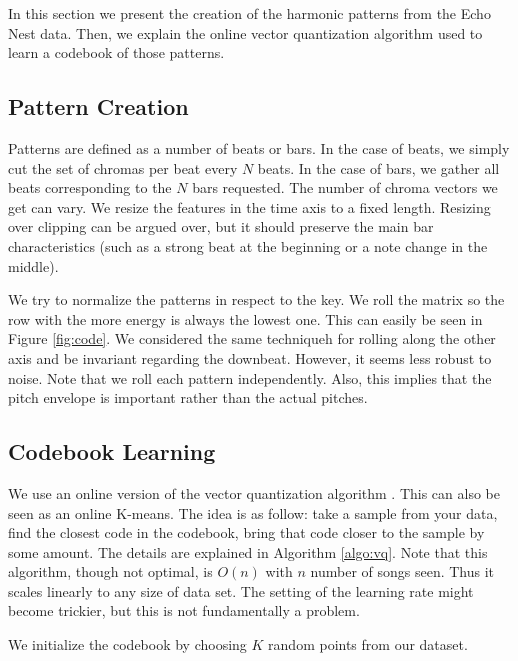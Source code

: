 \documentclass{article}
\begin{document}
In this section we present the creation of the harmonic patterns from
the Echo Nest data. Then, we explain the online vector quantization algorithm
used to learn a codebook of those patterns.

\subsection{Pattern Creation}
Patterns are defined as a number of beats or bars. In the case of beats,
we simply cut the set of chromas per beat every $N$ beats. In the case
of bars, we gather all beats corresponding to the $N$ bars requested.
The number of chroma vectors we get can vary. We resize the features in the
time axis to a fixed length. Resizing over clipping can be argued over, 
but it should
preserve the main bar characteristics (such as a strong beat at the beginning
or a note change in the middle).

We try to normalize the patterns in respect to the key. We roll the matrix
so the row with the more energy is always the lowest one. This can easily be
seen in Figure \ref{fig:code}. We considered the same techniqueh for rolling
along the other axis and be invariant regarding the downbeat. However, it
seems less robust to noise. Note that we roll each pattern independently.
Also, this implies that the pitch envelope is important rather than the actual 
pitches.


\subsection{Codebook Learning}
We use an online version of the vector quantization algorithm 
\cite{Gersho1991}. This can also be seen as an online K-means.
The idea is as follow: take a sample from your data, find the closest
code in the codebook, bring that code closer to the sample by some amount.
The details are explained in Algorithm \ref{algo:vq}. Note that this
algorithm, though not optimal, is $O(n)$ with $n$ number of songs seen.
Thus it scales linearly to any size of data set. The setting of the learning
rate might become trickier, but this is not fundamentally a problem.

We initialize the codebook by choosing $K$ random points from our dataset.
\end{document}
